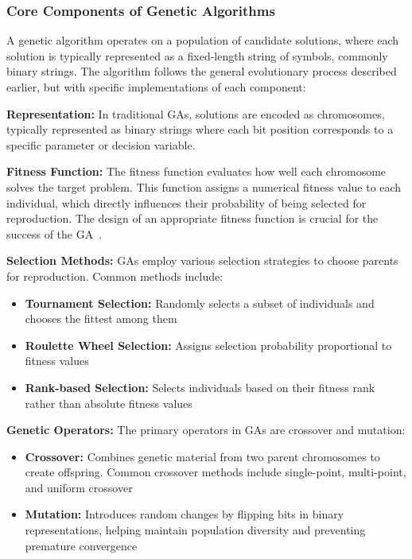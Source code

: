 \documentclass[a4paper,12pt]{article}
\begin{document}
\subsubsection{Core Components of Genetic Algorithms}
A genetic algorithm operates on a population of candidate solutions, where each solution is typically represented as a fixed-length string of symbols, commonly binary strings. The algorithm follows the general evolutionary process described earlier, but with specific implementations of each component:

\textbf{Representation:} In traditional GAs, solutions are encoded as chromosomes, 
typically represented as binary strings where each bit position corresponds to a specific parameter or decision variable. 

\textbf{Fitness Function:} The fitness function evaluates how well each chromosome solves the target problem. 
This function assigns a numerical fitness value to each individual, which directly influences their probability of being selected for reproduction. 
The design of an appropriate fitness function is crucial for the success of the GA~\cite{EAs}.

\textbf{Selection Methods:} GAs employ various selection strategies to choose parents for reproduction. Common methods include:
\begin{itemize}
   \item \textbf{Tournament Selection:} Randomly selects a subset of individuals and chooses the fittest among them
   \item \textbf{Roulette Wheel Selection:} Assigns selection probability proportional to fitness values
   \item \textbf{Rank-based Selection:} Selects individuals based on their fitness rank rather than absolute fitness values
\end{itemize}

\textbf{Genetic Operators:} The primary operators in GAs are crossover and mutation:
\begin{itemize}
   \item \textbf{Crossover:} Combines genetic material from two parent chromosomes to create offspring.
   Common crossover methods include single-point, multi-point, and uniform crossover
   \item \textbf{Mutation:} Introduces random changes by flipping bits in binary representations, 
   helping maintain population diversity and preventing premature convergence
\end{itemize}
\end{document}
